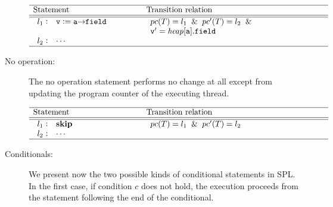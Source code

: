 \begin{description}
\[
\begin{array}[t]{p{8em}@{\hspace{6em}}p{\longtablesize}}
	\hline
	Statement & Transition relation \\ \hline\hline
	$\begin{array}[t]{l@{\hspace{0.3em}}c@{\hspace{1em}}l}
		l_1 & : & \mathtt{v := a \pointsto field} \\ \\
		l_2 & : & \mathtt{\cdots}
	\end{array}$
	&
	$\begin{array}[t]{ll}
		 \pc(T) = l_1 \And
		 \pc'(T) = l_2 \And \\
		 \mathtt{v}' = \heap[\mathtt{a}].\mathtt{field}
	 \end{array}$ \\
	 \hline
\end{array}
\]
	\item [No operation:]
		The no operation statement performs no change at all except from 
		updating the program counter of the executing thread.

\[
\begin{array}[t]{p{8em}@{\hspace{6em}}p{\longtablesize}}
	\hline
	Statement & Transition relation \\ \hline\hline
	$\begin{array}[t]{l@{\hspace{0.3em}}c@{\hspace{1em}}l}
		l_1 & : & \mathtt{\SkipStm} \\
		l_2 & : & \mathtt{\cdots}
	\end{array}$
	&
	$\begin{array}[t]{ll}
		 \pc(T) = l_1 \And
		 \pc'(T) = l_2
	 \end{array}$ \\ \hline
\end{array}
\]	

	\item [Conditionals:]
		We present now the two possible kinds of conditional statements in 
		SPL.
%
		In the first case, if condition $c$ does not hold, the execution 
		proceeds from the statement following the end of the conditional.


\end{description}
